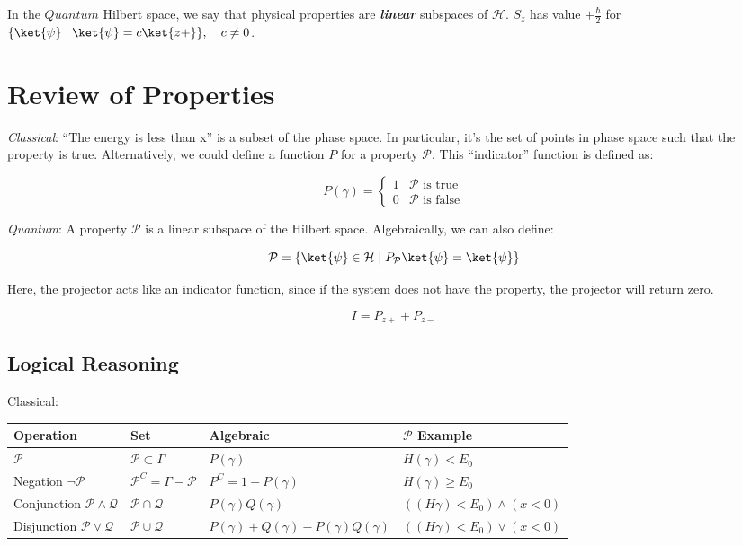 \documentclass[a4paper,twoside,master.tex]{subfiles}
\begin{document}
In the $Quantum$ Hilbert space, we say that physical properties are
\textbf{\emph{linear}} subspaces of $\mathcal{H}$. $S_z$ has value
$+\frac{\hbar}{2}$ for
$\{\ket{\psi}\mid\ket{\psi} = c\ket{z+}\},\quad c\neq 0$.



\section{Review of Properties}
\label{sec:review_of_properties}

\emph{Classical}: ``The energy is less than x'' is a subset of the phase
space. In particular, it's the set of points in phase space such that
the property is true. Alternatively, we could define a function $P$
for a property $\mathcal{P}$. This ``indicator'' function is defined as:

\begin{equation}
    P(\gamma) =
    \begin{cases}
        1 & \mathcal{P}\text{ is true}\\
        0 & \mathcal{P}\text{ is false}
    \end{cases}
\end{equation}

\emph{Quantum}: A property $\mathcal{P}$ is a linear subspace of the
Hilbert space. Algebraically, we can also define:

\begin{equation}
    \mathcal{P} = \{\ket{\psi}\in\mathcal{H}\mid P_\mathcal{P}\ket{\psi}=\ket{\psi}\}
\end{equation}

Here, the projector acts like an indicator function, since if the system
does not have the property, the projector will return zero.

\begin{equation}
    I = P_{z+} + P_{z-}
\end{equation}

\subsection{Logical Reasoning}
\label{sub:logical_reasoning}

Classical:

\begin{tabular}{@{}llll@{}}
\toprule
Operation & Set & Algebraic & $\mathcal{P}$ Example\\
\midrule
$\mathcal{P}$ & $\mathcal{P}\subset\Gamma$ & $P(\gamma)$ & $H(\gamma) < E_0$\\
\midrule
Negation $\neg\mathcal{P}$ & $\mathcal{P}^C = \Gamma - \mathcal{P}$ & $P^C = 1-P(\gamma)$ & $H(\gamma) \geq E_0$\\
\midrule
Conjunction $\mathcal{P}\wedge\mathcal{Q}$ & $\mathcal{P}\cap\mathcal{Q}$ & $P(\gamma)Q(\gamma)$ & $((H\gamma) < E_0)\wedge(x<0)$\\
\midrule
Disjunction $\mathcal{P}\vee\mathcal{Q}$ & $\mathcal{P}\cup\mathcal{Q}$ & $P(\gamma)+Q(\gamma)-P(\gamma)Q(\gamma)$ & $((H\gamma) < E_0)\vee(x<0)$\\
\bottomrule
\end{tabular}
\end{document}
